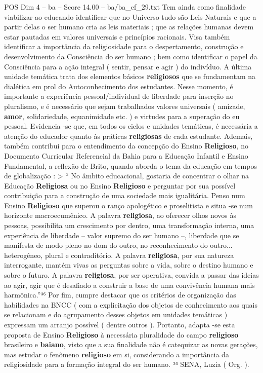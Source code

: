 \begin{textsample}{POS Dim 4 – ba – Score 14.00 – ba/ba\_ef\_29.txt}
Tem ainda como finalidade viabilizar ao educando identificar que no Universo tudo são Leis Naturais e que a partir delas o ser humano cria as leis materiais ; que as relações humanas devem estar pautadas em valores universais e princípios racionais.
Visa também identificar a importância da religiosidade para o despertamento, construção e desenvolvimento da Consciência do ser humano ; bem como identificar o papel da Consciência para a ação integral ( sentir, pensar e agir ) do indivíduo.
A última unidade temática trata dos elementos básicos \textbf{religiosos} que se fundamentam na dialética em prol do Autoconhecimento dos estudantes.
Nesse momento, é importante a experiência pessoal/individual de liberdade para inserção no pluralismo, e é necessário que sejam trabalhados valores universais ( amizade, \textbf{amor}, solidariedade, equanimidade etc. ) e virtudes para a superação do eu pessoal.
Evidencia -se que, em todos os ciclos e unidades temáticas, é necessária a atenção do educador quanto às práticas \textbf{religiosas} de cada estudante.
Ademais, também contribui para o entendimento da concepção do Ensino \textbf{Religioso}, no Documento Curricular Referencial da Bahia para a Educação Infantil e Ensino Fundamental, a reflexão de Brito, quando aborda o tema da educação em tempos de globalização : > “ No âmbito educacional, gostaria de concentrar o olhar na Educação \textbf{Religiosa} ou no Ensino \textbf{Religioso} e perguntar por sua possível contribuição para a construção de uma sociedade mais igualitária.
Penso num Ensino \textbf{Religioso} que superou o ranço apologético e proselitista e situa -se num horizonte macroecumênico.
A palavra \textbf{religiosa}, ao oferecer olhos novos às pessoas, possibilita um crescimento por dentro, uma transformação interna, uma experiência de liberdade – valor supremo do ser humano –, liberdade que se manifesta de modo pleno no dom do outro, no reconhecimento do outro... heterogêneo, plural e contraditório.
A palavra \textbf{religiosa}, por sua natureza interrogante, mantém vivas as perguntas sobre a vida, sobre o destino humano e sobre o futuro.
A palavra \textbf{religiosa}, por ser operativa, convida a passar das ideias ao agir, agir que é desafiado a construir a base de uma convivência humana mais harmônica.”³⁶ Por fim, cumpre destacar que os critérios de organização das habilidades na BNCC ( com a explicitação dos objetos de conhecimento aos quais se relacionam e do agrupamento desses objetos em unidades temáticas ) expressam um arranjo possível ( dentre outros ).
Portanto, adapta -se esta proposta de Ensino \textbf{Religioso} à necessária pluralidade do campo \textbf{religioso} brasileiro e \textbf{baiano}, visto que a sua finalidade não é catequizar as novas gerações, mas estudar o fenômeno \textbf{religioso} em si, considerando a importância da religiosidade para a formação integral do ser humano. ³⁴ SENA, Luzia ( Org. ).

\end{textsample}
